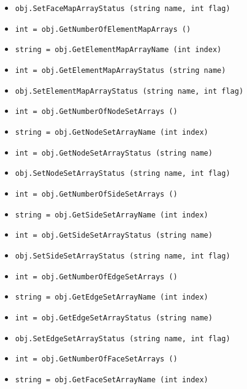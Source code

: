 \begin{itemize}
\item  \verb|obj.SetFaceMapArrayStatus (string name, int flag)|

\item  \verb|int = obj.GetNumberOfElementMapArrays ()|

\item  \verb|string = obj.GetElementMapArrayName (int index)|

\item  \verb|int = obj.GetElementMapArrayStatus (string name)|

\item  \verb|obj.SetElementMapArrayStatus (string name, int flag)|

\item  \verb|int = obj.GetNumberOfNodeSetArrays ()|

\item  \verb|string = obj.GetNodeSetArrayName (int index)|

\item  \verb|int = obj.GetNodeSetArrayStatus (string name)|

\item  \verb|obj.SetNodeSetArrayStatus (string name, int flag)|

\item  \verb|int = obj.GetNumberOfSideSetArrays ()|

\item  \verb|string = obj.GetSideSetArrayName (int index)|

\item  \verb|int = obj.GetSideSetArrayStatus (string name)|

\item  \verb|obj.SetSideSetArrayStatus (string name, int flag)|

\item  \verb|int = obj.GetNumberOfEdgeSetArrays ()|

\item  \verb|string = obj.GetEdgeSetArrayName (int index)|

\item  \verb|int = obj.GetEdgeSetArrayStatus (string name)|

\item  \verb|obj.SetEdgeSetArrayStatus (string name, int flag)|

\item  \verb|int = obj.GetNumberOfFaceSetArrays ()|

\item  \verb|string = obj.GetFaceSetArrayName (int index)|


\end{itemize}
